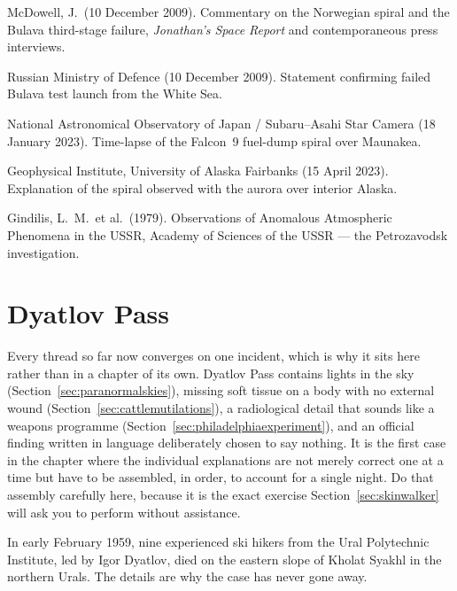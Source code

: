 \begin{srcnotes}
\item McDowell, J.\ (10 December 2009). Commentary on the Norwegian spiral and the Bulava third-stage
failure, \emph{Jonathan's Space Report} and contemporaneous press interviews.
\item Russian Ministry of Defence (10 December 2009). Statement confirming failed Bulava test launch
from the White Sea.
\item National Astronomical Observatory of Japan / Subaru--Asahi Star Camera (18 January 2023).
Time-lapse of the Falcon~9 fuel-dump spiral over Maunakea.
\item Geophysical Institute, University of Alaska Fairbanks (15 April 2023). Explanation of the
spiral observed with the aurora over interior Alaska.
\item Gindilis, L.\ M.\ et al.\ (1979). Observations of Anomalous Atmospheric Phenomena in the
USSR, Academy of Sciences of the USSR --- the Petrozavodsk investigation.
\end{srcnotes}

\section{Dyatlov Pass}\label{sec:dyatlovpass}

Every thread so far now converges on one incident, which is why it sits here rather than in a
chapter of its own. Dyatlov Pass contains lights in the sky
(Section~\ref{sec:paranormalskies}), missing soft tissue on a body with no external wound
(Section~\ref{sec:cattlemutilations}), a radiological detail that sounds like a weapons programme
(Section~\ref{sec:philadelphiaexperiment}), and an official finding written in language
deliberately chosen to say nothing. It is the first case in the chapter where the individual
explanations are not merely correct one at a time but have to be assembled, in order, to account
for a single night. Do that assembly carefully here, because it is the exact exercise
Section~\ref{sec:skinwalker} will ask you to perform without assistance.

In early February 1959, nine experienced ski hikers from the Ural Polytechnic Institute, led by
Igor Dyatlov, died on the eastern slope of Kholat Syakhl in the northern Urals. The details are
why the case has never gone away.

